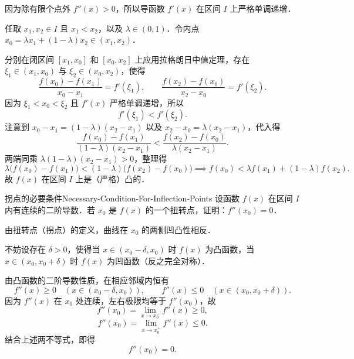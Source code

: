 \begin{myproof}
    因为除有限个点外 $f''(x) > 0$，所以导函数 $f'(x)$ 在区间 $I$ 上严格单调递增．

    任取 $x_1, x_2 \in I$ 且 $x_1 < x_2$，以及 $\lambda \in (0, 1)$．令内点 $x_0 = \lambda x_1 + (1 - \lambda)x_2 \in (x_1, x_2)$．

    分别在闭区间 $[x_1, x_0]$ 和 $[x_0, x_2]$ 上应用拉格朗日中值定理，存在 $\xi_1 \in (x_1, x_0)$ 与 $\xi_2 \in (x_0, x_2)$，使得
    \begin{equation}
        \frac{f(x_0) - f(x_1)}{x_0 - x_1} = f'(\xi_1), \qquad \frac{f(x_2) - f(x_0)}{x_2 - x_0} = f'(\xi_2).
    \end{equation}
    因为 $\xi_1 < x_0 < \xi_2$ 且 $f'(x)$ 严格单调递增，所以
    \begin{equation}
        f'(\xi_1) < f'(\xi_2).
    \end{equation}
    注意到 $x_0 - x_1 = (1 - \lambda)(x_2 - x_1)$ 以及 $x_2 - x_0 = \lambda(x_2 - x_1)$，代入得
    \begin{equation}
        \frac{f(x_0) - f(x_1)}{(1 - \lambda)(x_2 - x_1)} < \frac{f(x_2) - f(x_0)}{\lambda(x_2 - x_1)}.
    \end{equation}
    两端同乘 $\lambda(1 - \lambda)(x_2 - x_1) > 0$，整理得
    \begin{equation}
        \lambda\bigl( f(x_0) - f(x_1) \bigr) < (1 - \lambda)\bigl( f(x_2) - f(x_0) \bigr) \implies f(x_0) < \lambda f(x_1) + (1 - \lambda)f(x_2).
    \end{equation}
    故 $f(x)$ 在区间 $I$ 上是（严格）凸的．
\end{myproof}

\begin{problem}{拐点的必要条件}{Necessary-Condition-For-Inflection-Points}
    设函数 $f(x)$ 在区间 $I$ 内有连续的二阶导数．若 $x_0$ 是 $f(x)$ 的一个扭转点，证明：$f''(x_0) = 0$．
\end{problem}

\begin{myproof}
    由扭转点（拐点）的定义，曲线在 $x_0$ 的两侧凹凸性相反．

    不妨设存在 $\delta > 0$，使得当 $x \in (x_0 - \delta, x_0)$ 时 $f(x)$ 为凸函数，当 $x \in (x_0, x_0 + \delta)$ 时 $f(x)$ 为凹函数（反之完全对称）．

    由凸函数的二阶导数性质，在相应邻域内恒有
    \begin{equation}
        f''(x) \geqslant 0 \quad (x \in (x_0 - \delta, x_0)), \qquad f''(x) \leqslant 0 \quad (x \in (x_0, x_0 + \delta)).
    \end{equation}
    因为 $f''(x)$ 在 $x_0$ 处连续，左右极限均等于 $f''(x_0)$，故
    \begin{equation}
        f''(x_0) = \lim_{x\to x_0^-} f''(x) \geqslant 0,
    \end{equation}
    \begin{equation}
        f''(x_0) = \lim_{x\to x_0^+} f''(x) \leqslant 0.
    \end{equation}
    结合上述两不等式，即得
    \begin{equation}
        f''(x_0) = 0.
    \end{equation}
\end{myproof}

